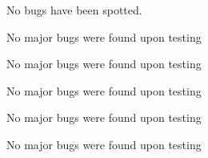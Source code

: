
\begin{DoxyRefList}
\item[\label{bug__bug000001}%
\hypertarget{bug__bug000001}{}%
File \hyperlink{game_8h}{game.h} ]No bugs have been spotted. 
\item[\label{bug__bug000002}%
\hypertarget{bug__bug000002}{}%
File \hyperlink{main_8cpp}{main.cpp} ]No major bugs were found upon testing  
\item[\label{bug__bug000003}%
\hypertarget{bug__bug000003}{}%
File \hyperlink{mainwindow_8cpp}{mainwindow.cpp} ]No major bugs were found upon testing 
\item[\label{bug__bug000004}%
\hypertarget{bug__bug000004}{}%
File \hyperlink{mainwindow_8h}{mainwindow.h} ]No major bugs were found upon testing 
\item[\label{bug__bug000005}%
\hypertarget{bug__bug000005}{}%
File \hyperlink{tile_8cpp}{tile.cpp} ]No major bugs were found upon testing 
\item[\label{bug__bug000006}%
\hypertarget{bug__bug000006}{}%
File \hyperlink{tile_8h}{tile.h} ]No major bugs were found upon testing
\end{DoxyRefList}